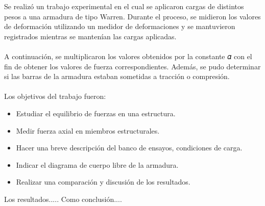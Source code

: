 \documentclass[
	spanish, %
	oneside
]{article}
\begin{document}
\templatePortrait

\templatePagecfg

\begin{abstractd}
	Se realizó un trabajo experimental en el cual se aplicaron cargas de distintos pesos a una armadura de tipo Warren. Durante el proceso, se midieron los valores de deformación utilizando un medidor de deformaciones y se mantuvieron registrados mientras se mantenían las cargas aplicadas. \\ \\
	A continuación, se multiplicaron los valores obtenidos por la constante 𝛼 con el fin de obtener los valores de fuerza correspondientes. Además, se pudo determinar si las barras de la armadura estaban sometidas a tracción o compresión.
	\\ \\
	Los objetivos del trabajo fueron:  
	\begin{itemize}
		\item Estudiar el equilibrio de fuerzas en una estructura.
		\item Medir fuerza axial en miembros estructurales.
		\item Hacer una breve descripción del banco de ensayos, condiciones de carga.
		\item Indicar el diagrama de cuerpo libre de la armadura.
		\item Realizar una comparación y discusión de los resultados.
	\end{itemize}


	Los resultados..... 
	Como conclusión.... 

\end{abstractd}

\templateIndex

\templateFinalcfg


\end{document}
